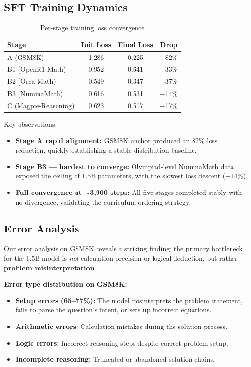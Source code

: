 \documentclass{article}
\begin{document}
\subsection{SFT Training Dynamics}

\begin{table}[H]
\centering
\caption{Per-stage training loss convergence}
\begin{tabular}{lccc}
\toprule
\textbf{Stage} & \textbf{Init Loss} & \textbf{Final Loss} & \textbf{Drop} \\
\midrule
A (GSM8K) & 1.286 & 0.225 & $-$82\% \\
B1 (OpenR1-Math) & 0.952 & 0.641 & $-$33\% \\
B2 (Orca-Math) & 0.549 & 0.347 & $-$37\% \\
B3 (NuminaMath) & 0.616 & 0.531 & $-$14\% \\
C (Magpie-Reasoning) & 0.623 & 0.517 & $-$17\% \\
\bottomrule
\end{tabular}
\end{table}

Key observations:
\begin{itemize}[noitemsep]
    \item \textbf{Stage A rapid alignment:} GSM8K anchor produced an 82\% loss reduction, quickly establishing a stable distribution baseline.
    \item \textbf{Stage B3 --- hardest to converge:} Olympiad-level NuminaMath data exposed the ceiling of 1.5B parameters, with the slowest loss descent ($-$14\%).
    \item \textbf{Full convergence at $\sim$3,900 steps:} All five stages completed stably with no divergence, validating the curriculum ordering strategy.
\end{itemize}

\subsection{Error Analysis}

Our error analysis on GSM8K reveals a striking finding: the primary bottleneck for the 1.5B model is \textit{not} calculation precision or logical deduction, but rather \textbf{problem misinterpretation}.

\textbf{Error type distribution on GSM8K:}
\begin{itemize}[noitemsep]
    \item \textbf{Setup errors (65--77\%):} The model misinterprets the problem statement, fails to parse the question's intent, or sets up incorrect equations.
    \item \textbf{Arithmetic errors:} Calculation mistakes during the solution process.
    \item \textbf{Logic errors:} Incorrect reasoning steps despite correct problem setup.
    \item \textbf{Incomplete reasoning:} Truncated or abandoned solution chains.
\end{itemize}
\end{document}
